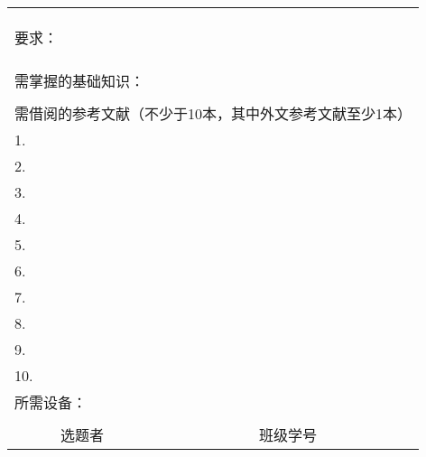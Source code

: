 \documentclass[a4paper]{article}
\begin{document}
\begin{center}
{\begin{tabular}{|c|c|p{4em}|c|p{4em}|c|p{4em}|c|p{4em}|c|p{4em}|}
    \multicolumn{11}{|l|}{} \\
    \multicolumn{11}{|l|}{} \\
    \multicolumn{11}{|l|}{} \\ \hline
    \multicolumn{11}{|l|}{\multirow{1}{\textwidth}{要求：}} \\
    \multicolumn{11}{|l|}{} \\
    \multicolumn{11}{|l|}{} \\
    \multicolumn{11}{|l|}{} \\ \hline
    \multicolumn{11}{|l|}{\multirow{1}{360pt}{需掌握的基础知识：}} \\
    \multicolumn{11}{|l|}{} \\ \hline
    \multicolumn{11}{|l|}{需借阅的参考文献（不少于10本，其中外文参考文献至少1本）}\\ \hline
    \multicolumn{11}{|l|}{1.}\\ \hline
    \multicolumn{11}{|l|}{2.}\\ \hline
    \multicolumn{11}{|l|}{3.}\\ \hline
    \multicolumn{11}{|l|}{4.}\\ \hline
    \multicolumn{11}{|l|}{5.}\\ \hline
    \multicolumn{11}{|l|}{6.}\\ \hline
    \multicolumn{11}{|l|}{7.}\\ \hline
    \multicolumn{11}{|l|}{8.}\\ \hline
    \multicolumn{11}{|l|}{9.}\\ \hline
    \multicolumn{11}{|l|}{10.}\\ \hline
    \multicolumn{11}{|l|}{\multirow{1}{360pt}{所需设备：}} \\
    \multicolumn{11}{|l|}{} \\ \hline
    选题者 & \multicolumn{2}{|c|}{} & \multicolumn{2}{|c|}{班级学号} & \multicolumn{6}{|c|}{} \\ \hline
    \end{tabular}
}
\end{center}
\end{document}
